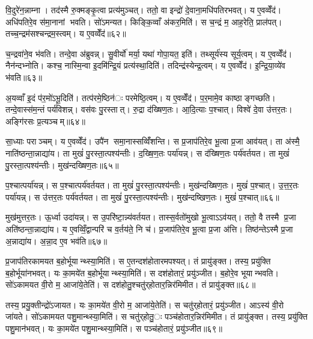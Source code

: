 वि॒दुरे॑न॒न्नाम्ना। तद॑स्मै रु॒क्मङ्कृ॒त्वा प्रत्य॑मुञ्चत्। ततो॒ वा इन्द्रो॑ दे॒वाना॒मधि॑पतिरभवत्। य ए॒वव्वेँद॑। अधि॑पतिरे॒व स॑मा॒नानां भवति। सो॑ऽमन्यत। किङ्कि॒व्वाँ अ॑कर॒मिति॑। स च॒न्द्रं म॒ आह॒रेति॒ प्राल॑पत्। तच्च॒न्द्रम॑सश्चन्द्रम॒स्त्वम्। य ए॒वव्वेँद॑॥६२॥

च॒न्द्रवा॑ने॒व भ॑वति। तन्दे॒वा अ॑ब्रुवन्न्। सु॒वीर्यो॑ मर्या॒ यथा॑ गोपा॒यत॒ इति॑। तथ्सूर्य॑स्य सूर्य॒त्वम्। य ए॒वव्वेँद॑। नैन॑न्दभ्नोति। कश्च॒ नास्मि॒न्वा इ॒दमि॑न्द्रि॒यं प्रत्य॑स्था॒दिति॑। तदिन्द्र॑स्येन्द्र॒त्वम्। य ए॒वव्वेँद॑। इ॒न्द्रि॒या॒व्ये॑व भ॑वति॥६३॥

अ॒यव्वाँ इ॒दं प॑र॒मो॑ऽभू॒दिति॑। तत्प॑रमे॒ष्ठिन॑ः परमेष्ठि॒त्वम्। य ए॒वव्वेँद॑। प॒र॒मामे॒व काष्ठाङ्गच्छति। तन्दे॒वास्स॑म॒न्तं पर्य॑विशन्न्। वस॑वः पु॒रस्तात्। रु॒द्रा द॑ख्षिण॒तः। आ॒दि॒त्याः प॒श्चात्। विश्वे॑ दे॒वा उ॑त्तर॒तः। अङ्गि॑रसः प्र॒त्यञ्चम्॥६४॥

सा॒ध्याः पराञ्चम्। य ए॒वव्वेँद॑। उपै॑न समा॒नास्सव्विँ॑शन्ति। स प्र॒जाप॑तिरे॒व भू॒त्वा प्र॒जा आव॑यत्। ता अ॑स्मै॒ नाति॑ष्ठन्ता॒न्नाद्या॑य। ता मुखं॑ पु॒रस्ता॒त्पश्य॑न्तीः। द॒ख्षि॒ण॒तः पर्या॑यन्न्। स द॑ख्षिण॒तः पर्य॑वर्तयत। ता मुखं॑ पु॒रस्ता॒त्पश्य॑न्तीः। मुख॑न्दख्षिण॒तः॥६५॥

प॒श्चात्पर्या॑यन्न्। स प॒श्चात्पर्य॑वर्तयत। ता मुखं॑ पु॒रस्ता॒त्पश्य॑न्तीः। मुख॑न्दख्षिण॒तः। मुखं॑ प॒श्चात्। उ॒त्त॒र॒तः पर्या॑यन्न्। स उ॑त्तर॒तः पर्य॑वर्तयत। ता मुखं॑ पु॒रस्ता॒त्पश्य॑न्तीः। मुख॑न्दष्खिण॒तः। मुखं॑ प॒श्चात्॥६६॥

मुख॑मुत्तर॒तः। ऊ॒र्ध्वा उदा॑यन्न्। स उ॒परि॑ष्टा॒न्न्य॑वर्तयत। तास्स॒र्वतो॑मुखो भू॒त्वाऽऽव॑यत्। ततो॒ वै तस्मै प्र॒जा अति॑ष्ठन्ता॒न्नाद्या॑य। य ए॒वव्विँ॒द्वान्परि॑ च व॒र्तय॑ते॒ नि च॑। प्र॒जाप॑तिरे॒व भू॒त्वा प्र॒जा अ॑त्ति। तिष्ठ॑न्तेऽस्मै प्र॒जा अ॒न्नाद्या॑य। अ॒न्ना॒द ए॒व भव॑ति॥६७॥


प्र॒जाप॑तिरकामयत ब॒होर्भूयान्थ्स्या॒मिति॑। स ए॒तन्दश॑होतारमपश्यत्। तं प्रायु॑ङ्क्त। तस्य॒ प्रयु॑क्ति ब॒होर्भूया॑नभवत्। यः का॒मये॑त ब॒होर्भूयान्थ्स्या॒मिति॑। स दश॑होतारं॒ प्रयु॑ञ्जीत। ब॒होरे॒व भूयान्भवति। सो॑ऽकामयत वी॒रो म॒ आजा॑ये॒तेति॑। स दश॑होतु॒श्चतु॑र्‌होतार॒न्निर॑मिमीत। तं प्रायु॑ङ्क्त॥६८॥

तस्य॒ प्रयु॒क्तीन्द्रो॑ऽजायत। यः का॒मये॑त वी॒रो म॒ आजा॑ये॒तेति॑। स चतु॑र्‌होतारं॒ प्रयु॑ञ्जीत। आऽस्य॑ वी॒रो जा॑यते। सो॑ऽकामयत पशु॒मान्थ्स्या॒मिति॑। स चतु॑र्‌होतु॒ः पञ्च॑होतार॒न्निर॑मिमीत। तं प्रायु॑ङ्क्त। तस्य॒ प्रयु॑क्ति पशु॒मान॑भवत्। यः का॒मये॑त पशु॒मान्थ्स्या॒मिति॑। स पञ्च॑होतारं॒ प्रयु॑ञ्जीत॥६९॥

